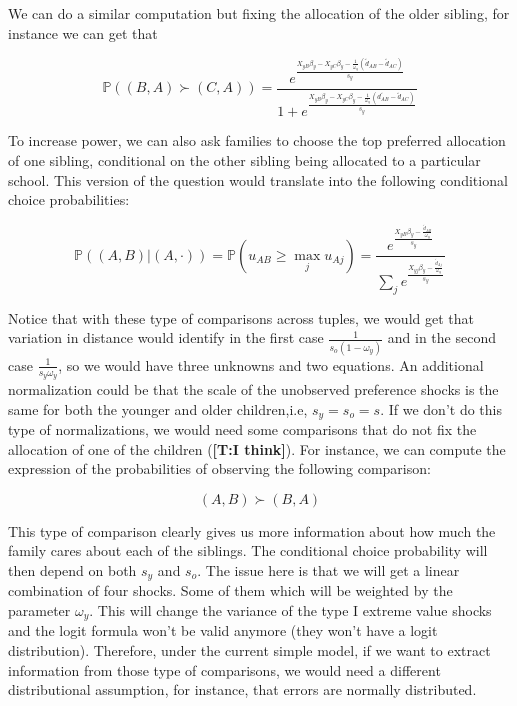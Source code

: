 \documentclass{article}
\newcommand{\tomas}[1]{{\color{red}\textbf{[T:#1]}}}
\begin{document}
We can do a similar computation but fixing the allocation of the older sibling, for instance we can get that 

\begin{equation}
 \mathbb{P} \left( (B, A)  \succ (C,A)  \right) =   \frac{e^{\frac{X_{yB}\beta_y - X_{yC}\beta_y - \frac{1}{\omega_y}\left( \tilde{d}_{AB} - \tilde{d}_{AC}\right)}{s_y}}}{1 + e^{\frac{X_{yB}\beta_y - X_{yC}\beta_y - \frac{1}{\omega_y}\left( \tilde{d_{AB}} - \tilde{d}_{AC}\right)}{s_y}}} 
\end{equation}

To increase power, we can also ask families to choose the top preferred allocation of one sibling, conditional on the other sibling being allocated to a particular school. This version of the question would translate into the following conditional choice probabilities:

\begin{equation}
    \mathbb{P} \left( (A, B) | \left(A, \cdot \right)  \right) =  \mathbb{P} \left( u_{AB} \geq \max_j u_{Aj}  \right) = \frac{e^{\frac{X_{yB}\beta_y - \frac{\tilde{d}_{AB}}{\omega_y} }{s_y}}}{\sum_j e^{\frac{X_{yj}\beta_y - \frac{\tilde{d}_{Aj}}{\omega_y} }{s_y}}} 
\end{equation}



Notice that with these type of comparisons across tuples, we would get that variation in distance would identify in the first case $\frac{1}{s_o(1-\omega_y)}$ and in the second case $\frac{1}{s_y\omega_y}$, so we would have three unknowns and two equations. An additional normalization could be that the scale of the unobserved preference shocks is the same for both the younger and older children,i.e, $s_y = s_o = s$. If we don't do this type of normalizations, we would need some comparisons that do not fix the allocation of one of the children (\tomas{I think}). For instance, we can compute the expression of the probabilities of observing the following comparison:

\begin{equation}
    (A, B)  \succ (B,A)
\end{equation}

This type of comparison clearly gives us more information about how much the family cares about each of the siblings. The conditional choice probability will then depend on both $s_y$ and $s_o$. The issue here is that we will get a linear combination of four shocks. Some of them which will be weighted by the parameter $\omega_y$. This will change the variance of the type I extreme value shocks and the logit formula won't be valid anymore (they won't have a logit distribution). Therefore, under the current simple model, if we want to extract information from those type of comparisons, we would need a different distributional assumption, for instance, that errors are normally distributed. 
\end{document}
